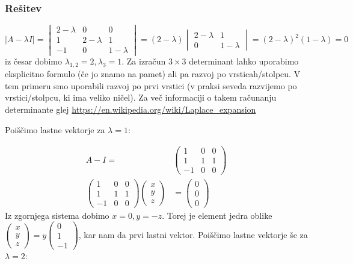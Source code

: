 \documentclass{article}
\begin{document}
\subsubsection*{Rešitev}
\begin{equation*}
|A-\lambda I | =
\begin{vmatrix}
2-\lambda & 0 & 0 \\
1  & 2-\lambda & 1 \\
-1 & 0 & 1-\lambda
\end{vmatrix} = (2-\lambda) \begin{vmatrix} 2-\lambda & 1 \\ 0 & 1-\lambda \end{vmatrix} = (2-\lambda)^2(1-\lambda) = 0
\end{equation*}
iz česar dobimo $\lambda_{1,2} = 2, \lambda_3 = 1$.
Za izračun $3 \times 3$ determinant lahko uporabimo eksplicitno formulo (če jo znamo na pamet) ali pa razvoj po vrsticah/stolpcu. V tem primeru smo uporabili razvoj po prvi vrstici (v praksi seveda razvijemo po vrstici/stolpcu, ki ima veliko ničel). Za več informaciji o takem računanju determinante glej \href{https://en.wikipedia.org/wiki/Laplace\_expansion}{https://en.wikipedia.org/wiki/Laplace\_expansion}
\vspace{1em}

\noindent Poiščimo lastne vektorje za $\lambda = 1$:

\begin{align*}
A-I  =&
\begin{pmatrix}
1 & 0 & 0 \\
1  & 1 & 1 \\
-1 & 0 & 0
\end{pmatrix} \\
\begin{pmatrix}
1 & 0 & 0 \\
1  & 1 & 1 \\
-1 & 0 & 0
\end{pmatrix}
\begin{pmatrix}
x \\ y \\ z \end{pmatrix} &= \begin{pmatrix} 0 \\ 0 \\ 0\end{pmatrix}
\end{align*}
Iz zgornjega sistema dobimo $x=0, y=-z$. 
Torej je element jedra oblike $\begin{pmatrix} x \\ y \\ z \end{pmatrix} = y \begin{pmatrix} 0 \\ 1 \\ -1 \end{pmatrix}$, kar nam da prvi lastni vektor.
Poiščimo lastne vektorje še za $\lambda = 2$:
\end{document}
